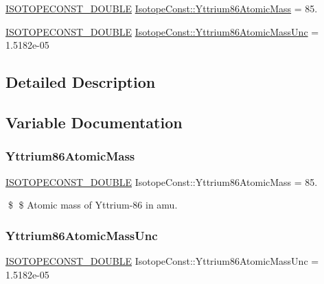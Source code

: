 \begin{DoxyCompactItemize}
\item 
\mbox{\hyperlink{group___isotope_const-_macros_ga8f45a7272ce02c0b4c65c44636ed719a}{I\+S\+O\+T\+O\+P\+E\+C\+O\+N\+S\+T\+\_\+\+D\+O\+U\+B\+LE}} \mbox{\hyperlink{group___isotope_const-_yttrium-_y86_gafedc2585f7d443940f1fcbf83e45c64e}{Isotope\+Const\+::\+Yttrium86\+Atomic\+Mass}} = 85.
\item 
\mbox{\hyperlink{group___isotope_const-_macros_ga8f45a7272ce02c0b4c65c44636ed719a}{I\+S\+O\+T\+O\+P\+E\+C\+O\+N\+S\+T\+\_\+\+D\+O\+U\+B\+LE}} \mbox{\hyperlink{group___isotope_const-_yttrium-_y86_ga3e2c47f4626b456d091697e5d939cb82}{Isotope\+Const\+::\+Yttrium86\+Atomic\+Mass\+Unc}} = 1.\+5182e-\/05
\end{DoxyCompactItemize}


\subsection{Detailed Description}


\subsection{Variable Documentation}
\mbox{\label{group___isotope_const-_yttrium-_y86_gafedc2585f7d443940f1fcbf83e45c64e}} 
\subsubsection{\texorpdfstring{Yttrium86\+Atomic\+Mass}{Yttrium86AtomicMass}}
{\footnotesize\ttfamily \mbox{\hyperlink{group___isotope_const-_macros_ga8f45a7272ce02c0b4c65c44636ed719a}{I\+S\+O\+T\+O\+P\+E\+C\+O\+N\+S\+T\+\_\+\+D\+O\+U\+B\+LE}} Isotope\+Const\+::\+Yttrium86\+Atomic\+Mass = 85.}

\$ \$ Atomic mass of Yttrium-\/86 in amu. \mbox{\label{group___isotope_const-_yttrium-_y86_ga3e2c47f4626b456d091697e5d939cb82}} 
\subsubsection{\texorpdfstring{Yttrium86\+Atomic\+Mass\+Unc}{Yttrium86AtomicMassUnc}}
{\footnotesize\ttfamily \mbox{\hyperlink{group___isotope_const-_macros_ga8f45a7272ce02c0b4c65c44636ed719a}{I\+S\+O\+T\+O\+P\+E\+C\+O\+N\+S\+T\+\_\+\+D\+O\+U\+B\+LE}} Isotope\+Const\+::\+Yttrium86\+Atomic\+Mass\+Unc = 1.\+5182e-\/05}

